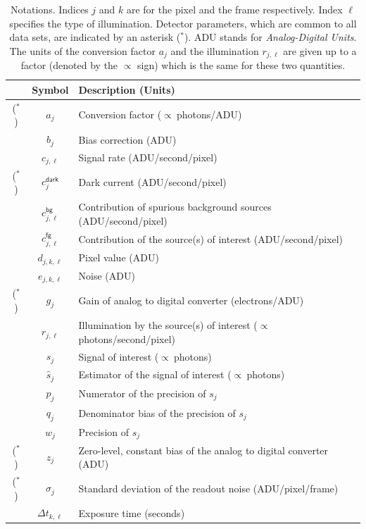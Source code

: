 \documentclass[a4paper,11pt,twoside]{scrartcl}
\newcommand*{\Tag}[1]{\mathsf{#1}}
\newcommand*{\estim}[1]{\widehat{#1}}
\theoremstyle{plain} %
\theoremstyle{definition}
\theoremstyle{remark}
\begin{document}
\begin{table}
  \begin{tabular}{ccl}
    \hline
    & Symbol & Description (Units)\\
    \hline
    \hline
    ($^\ast$) & $a_j$ & Conversion factor ($\propto\:$photons/ADU)\\
    & $b_j$ & Bias correction (ADU)\\
    & $c_{j,\ell}$ & Signal rate (ADU/second/pixel) \\[0.3ex]
    ($^\ast$) & $c^\Tag{dark}_j$ & Dark current (ADU/second/pixel) \\[0.3ex]
    & $c^\Tag{bg}_{j,\ell}$ & Contribution of spurious background sources
    (ADU/second/pixel) \\[0.3ex]
    & $c^\Tag{fg}_{j,\ell}$ & Contribution of the source(s) of interest
    (ADU/second/pixel) \\
    & $d_{j,k,\ell}$ & Pixel value (ADU) \\
    & $e_{j,k,\ell}$ & Noise (ADU) \\
    ($^\ast$) & $g_j$ & Gain of analog to digital converter (electrons/ADU) \\
    & $r_{j,\ell}$ & Illumination by the source(s) of interest
    ($\propto\:$photons/second/pixel) \\
    & $s_j$ & Signal of interest ($\propto\:$photons) \\
    & $\estim{s}_j$ & Estimator of the signal of interest
    ($\propto\:$photons) \\
    & $p_j$ & Numerator of the precision of $s_j$ \\
    & $q_j$ & Denominator bias of the precision of $s_j$ \\
    & $w_j$ & Precision of $s_j$ \\
    ($^\ast$) & $z_j$ & Zero-level, constant bias of the analog to digital
    converter (ADU) \\
    ($^\ast$) & $\sigma_j$
    & Standard deviation of the readout noise (ADU/pixel/frame) \\
    & $\Delta t_{k,\ell}$ & Exposure time (seconds) \\
    \hline
  \end{tabular}
  \caption{Notations. Indices $j$ and $k$ are for the pixel and the frame
  respectively. Index $\ell$ specifies the type of illumination. Detector
  parameters, which are common to all data sets, are indicated by an asterisk
  ($^\ast$). ADU stands for \emph{Analog-Digital Units}.  The units of the
  conversion factor $a_j$ and the illumination $r_{j,\ell}$ are given up to a
  factor (denoted by the $\propto$ sign) which is the same for these two
  quantities.} \label{tab:notation}
\end{table}
\end{document}
